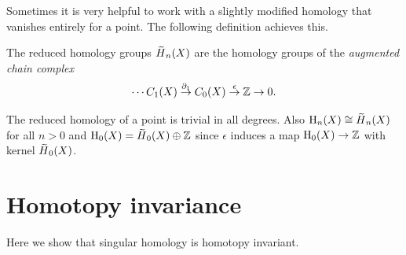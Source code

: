 Sometimes it is very helpful to work with a slightly modified homology that vanishes entirely for a point. The following definition achieves this.

\begin{defn}
    The reduced homology groups $\wt{H}_n(X)$ are the homology groups of the \emph{augmented chain complex}
    \[\cdots C_1(X)\overset{\partial_1}\to C_0(X)\overset{\epsilon}\to \mathbb{Z}\to 0.\]
\end{defn}

The reduced homology of a point is trivial in all degrees. Also $\rmH_n(X)\cong \wt{H}_n(X)$ for all $n>0$ and $\rmH_0(X)=\wt{H}_0(X)\oplus \bbZ$ since $\epsilon$ induces a map $\mathrm{H}_0(X)\to \mathbb{Z}$ with kernel $\wt{H}_0(X)$.




\section{Homotopy invariance}

Here we show that singular homology is homotopy invariant.

